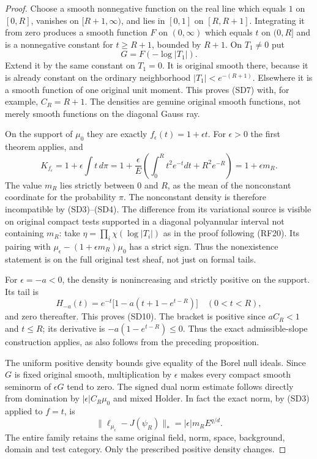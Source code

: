 \documentclass[11pt,a4paper]{article}
\numberwithin{equation}{section}
\theoremstyle{definition}
\theoremstyle{remark}
\begin{document}
\begin{proof}
Choose a smooth nonnegative function on the real line
which equals $1$ on $[0,R]$, vanishes on $[R+1,\infty)$,
and lies in $[0,1]$ on $[R,R+1]$.  Integrating it
from zero produces a smooth function $F$ on $(0,\infty)$
which equals $t$ on $(0,R]$ and is a nonnegative
constant for $t\ge R+1$, bounded by $R+1$.
On $T_1\ne0$ put
\[
                         G=F(-\log|T_1|).
 \tag{SD11}
\]
Extend it by the same constant on $T_1=0$.  It is
original smooth there, because it is already constant
on the ordinary neighborhood $|T_1|<e^{-(R+1)}$.
Elsewhere it is a smooth function of one original
unit moment.  This proves \textup{(SD7)} with,
for example, $C_R=R+1$.  The densities are genuine
original smooth functions, not merely smooth
functions on the diagonal Gauss ray.

On the support of $\mu_0$ they are exactly
$f_\epsilon(t)=1+\epsilon t$.  For $\epsilon>0$
the first theorem applies, and
\[
 K_{f_\epsilon}=1+\epsilon\int t\,d\pi
 =1+\frac{\epsilon}{E}
       \left(\int_0^R t^2e^{-t}dt+R^2e^{-R}\right)
 =1+\epsilon m_R.
\]
The value $m_R$ lies strictly between $0$ and $R$,
as the mean of the nonconstant coordinate for the
probability $\pi$.  The nonconstant density is
therefore incompatible by \textup{(SD3)--(SD4)}.
The difference from its variational source is visible
on original compact tests supported in a diagonal
polyannular interval not containing $m_R$:
take $\eta=\prod_i\chi(\log|T_i|)$ as in the
proof following \textup{(RF20)}.  Its pairing with
$\mu_\epsilon-(1+\epsilon m_R)\mu_0$ has a strict
sign.  Thus the nonexistence statement is on the
full original test sheaf, not just on formal tails.

For $\epsilon=-a<0$, the density is nonincreasing
and strictly positive on the support.  Its tail is
\[
 H_{-a}(t)=e^{-t}
               \bigl[1-a(t+1-e^{t-R})\bigr]\quad(0<t<R),
\]
and zero thereafter.  This proves \textup{(SD10)}.
The bracket is positive since $aC_R<1$ and $t\le R$;
its derivative is $-a(1-e^{t-R})\le0$.
Thus the exact admissible-slope construction applies,
as also follows from the preceding proposition.

The uniform positive density bounds give equality
of the Borel null ideals.  Since $G$ is fixed
original smooth, multiplication by $\epsilon$
makes every compact smooth seminorm of
$\epsilon G$ tend to zero.  The signed dual norm
estimate follows directly from domination by
$|\epsilon|C_R\mu_0$ and mixed Holder.  In fact
the exact norm, by \textup{(SD3)} applied to $f=t$,
is
\[
       \|\ell_{\mu_\epsilon}-J(\psi_R)\|_*
                         =|\epsilon|m_R E^{q/d}.
 \tag{SD12}
\]
The entire family retains the same original field,
norm, space, background, domain and test category.
Only the prescribed positive density changes.
\end{proof}
\end{document}
